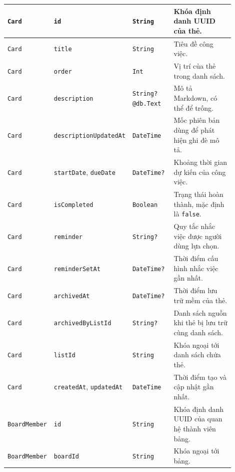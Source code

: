 \documentclass[../DoAn.tex]{subfiles}
\begin{document}
\begin{longtable}{|>{\raggedright\arraybackslash}p{0.15\linewidth}|>{\raggedright\arraybackslash}p{0.22\linewidth}|>{\raggedright\arraybackslash}p{0.19\linewidth}|>{\raggedright\arraybackslash}p{0.34\linewidth}|}
    \texttt{Card} & \texttt{id} & \texttt{String} & Khóa định danh UUID của thẻ. \\ \hline
    \texttt{Card} & \texttt{title} & \texttt{String} & Tiêu đề công việc. \\ \hline
    \texttt{Card} & \texttt{order} & \texttt{Int} & Vị trí của thẻ trong danh sách. \\ \hline
    \texttt{Card} & \texttt{description} & \texttt{String?}\newline\texttt{@db.Text} & Mô tả Markdown, có thể để trống. \\ \hline
    \texttt{Card} & \texttt{description}\newline\texttt{UpdatedAt} & \texttt{DateTime} & Mốc phiên bản dùng để phát hiện ghi đè mô tả. \\ \hline
    \texttt{Card} & \texttt{startDate}, \texttt{dueDate} & \texttt{DateTime?} & Khoảng thời gian dự kiến của công việc. \\ \hline
    \texttt{Card} & \texttt{isCompleted} & \texttt{Boolean} & Trạng thái hoàn thành, mặc định là \texttt{false}. \\ \hline
    \texttt{Card} & \texttt{reminder} & \texttt{String?} & Quy tắc nhắc việc được người dùng lựa chọn. \\ \hline
    \texttt{Card} & \texttt{reminder}\newline\texttt{SetAt} & \texttt{DateTime?} & Thời điểm cấu hình nhắc việc gần nhất. \\ \hline
    \texttt{Card} & \texttt{archivedAt} & \texttt{DateTime?} & Thời điểm lưu trữ mềm của thẻ. \\ \hline
    \texttt{Card} & \texttt{archivedBy}\newline\texttt{ListId} & \texttt{String?} & Danh sách nguồn khi thẻ bị lưu trữ cùng danh sách. \\ \hline
    \texttt{Card} & \texttt{listId} & \texttt{String} & Khóa ngoại tới danh sách chứa thẻ. \\ \hline
    \texttt{Card} & \texttt{createdAt}, \texttt{updatedAt} & \texttt{DateTime} & Thời điểm tạo và cập nhật gần nhất. \\ \hline
    \texttt{Board}\newline\texttt{Member} & \texttt{id} & \texttt{String} & Khóa định danh UUID của quan hệ thành viên bảng. \\ \hline
    \texttt{Board}\newline\texttt{Member} & \texttt{boardId} & \texttt{String} & Khóa ngoại tới bảng. \\ \hline

\end{longtable}
\end{document}
